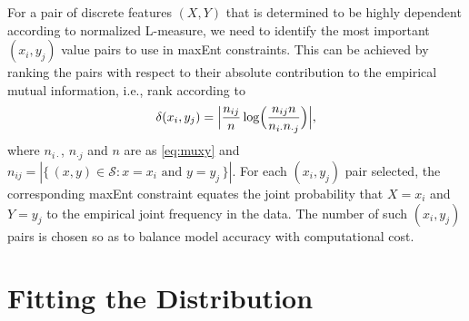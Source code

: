 \documentclass[11pt]{article}
\newcommand{\xS}{\mathcal{S}}
\begin{document}
For a pair of discrete features $(X,Y)$ that is determined to be highly dependent according to normalized L-measure, we need to identify the most important $(x_i,y_j)$ value pairs to use in maxEnt constraints. This can be achieved by ranking the pairs with respect to their absolute contribution to the empirical mutual information, i.e., rank according to
\[
\delta(x_i,y_j)=\Bigl\vert \frac{n_{ij}}{n}\log\Bigl(\frac{n_{ij}n}{n_{i\cdot}n_{\cdot j}}\Bigr)\Bigr\vert,
\] 
where $n_{i\cdot}$, $n_{\cdot j}$ and $n$ are as \eqref{eq:muxy} and $n_{ij}=|\{\,(x,y)\in\xS:x=x_i\text{ and }y=y_j\,\}|$. For each $(x_i,y_j)$ pair selected, the corresponding maxEnt constraint equates the joint probability that $X=x_i$ and $Y=y_j$ to the empirical joint frequency in the data. The number of such $(x_i,y_j)$ pairs is chosen so as to balance model accuracy with computational cost. 

\section{Fitting the Distribution}
\end{document}
